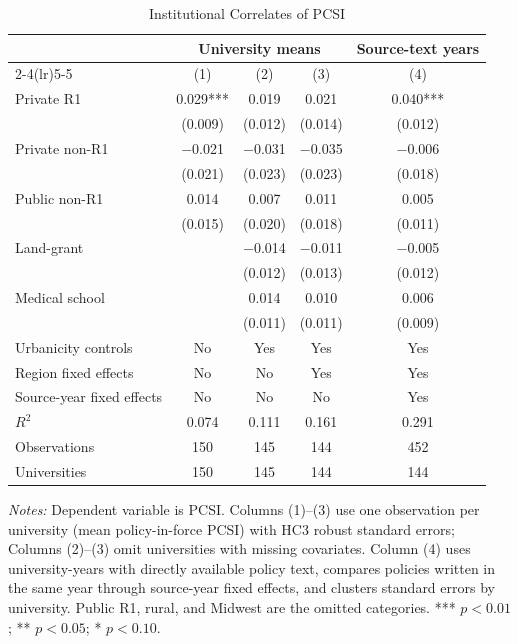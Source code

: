 \begin{table}[htbp]
\centering
\small
\caption{Institutional Correlates of PCSI}
\label{tab:inst-reg}
\begin{threeparttable}
\begin{tabular}{lcccc}
\toprule
 & \multicolumn{3}{c}{University means} & Source-text years \\
\cmidrule(lr){2-4}\cmidrule(lr){5-5}
 & (1) & (2) & (3) & (4) \\
\midrule
Private R1 & 0.029*** & 0.019 & 0.021 & 0.040*** \\
 & (0.009) & (0.012) & (0.014) & (0.012) \\
Private non-R1 & $-$0.021 & $-$0.031 & $-$0.035 & $-$0.006 \\
 & (0.021) & (0.023) & (0.023) & (0.018) \\
Public non-R1 & 0.014 & 0.007 & 0.011 & 0.005 \\
 & (0.015) & (0.020) & (0.018) & (0.011) \\
Land-grant &  & $-$0.014 & $-$0.011 & $-$0.005 \\
 &  & (0.012) & (0.013) & (0.012) \\
Medical school &  & 0.014 & 0.010 & 0.006 \\
 &  & (0.011) & (0.011) & (0.009) \\
\midrule
Urbanicity controls & No & Yes & Yes & Yes \\
Region fixed effects & No & No & Yes & Yes \\
Source-year fixed effects & No & No & No & Yes \\
$R^2$ & 0.074 & 0.111 & 0.161 & 0.291 \\
Observations & 150 & 145 & 144 & 452 \\
Universities & 150 & 145 & 144 & 144 \\
\bottomrule
\end{tabular}
\begin{tablenotes}[flushleft]\footnotesize
\item \textit{Notes:} Dependent variable is PCSI. Columns (1)--(3) use one observation per university (mean policy-in-force PCSI) with HC3 robust standard errors; Columns (2)--(3) omit universities with missing covariates. Column (4) uses university-years with directly available policy text, compares policies written in the same year through source-year fixed effects, and clusters standard errors by university. Public R1, rural, and Midwest are the omitted categories. *** $p<0.01$; ** $p<0.05$; * $p<0.10$.
\end{tablenotes}
\end{threeparttable}
\end{table}
